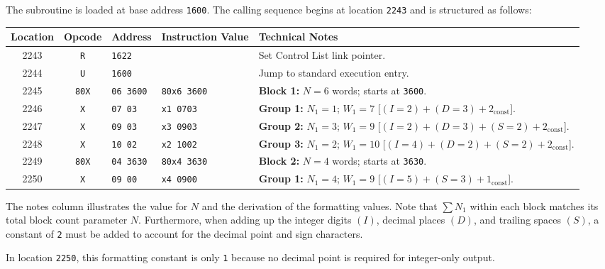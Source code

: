 The subroutine is loaded at base address \texttt{1600}. The calling sequence begins at location \texttt{2243} and is structured as follows:

\begin{center}
\small
\begin{tabularx}{\textwidth}{ccllX}
    \toprule
    \textbf{Location} & \textbf{Opcode} & \textbf{Address} & \textbf{Instruction Value} & \textbf{Technical Notes} \\
    \midrule
    2243 & \texttt{R}   & \texttt{1622}    &                       & Set Control List link pointer. \\
    2244 & \texttt{U}   & \texttt{1600}    &                       & Jump to standard execution entry. \\
    2245 & \texttt{80X} & \texttt{06 3600} & \texttt{80x6 3600}    & \textbf{Block 1:} $N=6$ words; starts at \texttt{3600}. \\
    2246 & \texttt{X}   & \texttt{07 03}   & \texttt{x1 0703}      & \textbf{Group 1:} $N_1=1$; $W_1=7$ [$(I=2)+(D=3)+2_{\text{const}}$]. \\
    2247 & \texttt{X}   & \texttt{09 03}   & \texttt{x3 0903}      & \textbf{Group 2:} $N_1=3$; $W_1=9$ [$(I=2)+(D=3)+(S=2)+2_{\text{const}}$]. \\
    2248 & \texttt{X}   & \texttt{10 02}   & \texttt{x2 1002}      & \textbf{Group 3:} $N_1=2$; $W_1=10$ [$(I=4)+(D=2)+(S=2)+2_{\text{const}}$]. \\
    2249 & \texttt{80X} & \texttt{04 3630} & \texttt{80x4 3630}    & \textbf{Block 2:} $N=4$ words; starts at \texttt{3630}. \\
    2250 & \texttt{X}   & \texttt{09 00}   & \texttt{x4 0900}      & \textbf{Group 1:} $N_1=4$; $W_1=9$ [$(I=5)+(S=3)+1_{\text{const}}$]. \\
    \bottomrule
\end{tabularx}
\end{center}

The notes column illustrates the value for $N$ and the derivation of the formatting values. Note that $\sum N_1$ within each block matches its total block count parameter $N$. Furthermore, when adding up the integer digits $(I)$, decimal places $(D)$, and trailing spaces $(S)$, a constant of \texttt{2} must be added to account for the decimal point and sign characters. 

In location \texttt{2250}, this formatting constant is only \texttt{1} because no decimal point is required for integer-only output.

